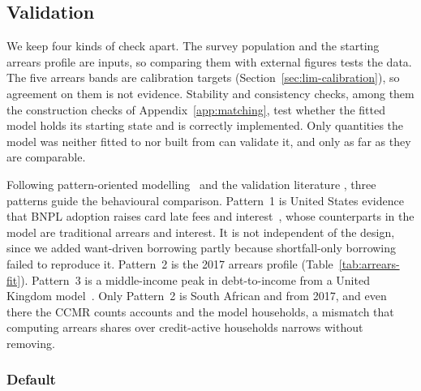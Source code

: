 

\subsection{Validation}
\label{sec:data-validation}

We keep four kinds of check apart. The survey population and the starting arrears profile are
inputs, so comparing them with external figures tests the data. The five arrears bands are
calibration targets (Section~\ref{sec:lim-calibration}), so agreement on them is not evidence.
Stability and consistency checks, among them the construction checks of
Appendix~\ref{app:matching}, test whether the fitted model holds its starting state and is
correctly implemented. Only quantities the model was neither fitted to nor built from can
validate it, and only as far as they are comparable.

\label{sec:lim-validation}
Following pattern-oriented modelling~\citep{grimm2005pom} and the validation literature
\citep{windrum2007validation}, three
patterns guide the behavioural comparison. Pattern~1 is United States evidence that \ac{BNPL} adoption raises
card late fees and interest~\citep{dehaan2024bnpl}, whose counterparts in the model are
traditional arrears and interest. It is not independent of the design, since we added
want-driven borrowing partly because shortfall-only borrowing failed to reproduce it. Pattern~2 is
the 2017 arrears profile (Table~\ref{tab:arrears-fit}). Pattern~3 is a middle-income peak in debt-to-income from a United Kingdom
model~\citep{hamill2023creditcard}. Only Pattern~2 is South African and from 2017, and even there the \ac{CCMR}
counts accounts and the model households, a mismatch that computing arrears shares over
credit-active households narrows without removing.

\subsubsection*{Default}

